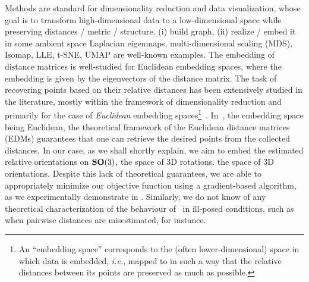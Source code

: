 Methods are standard for dimensionality reduction and data visualization, whose goal is to transform high-dimensional data to a low-dimensional space while preserving distances / metric / structure.
(i) build graph, (ii) realize / embed it in some ambient space
Laplacian eigenmaps, multi-dimensional scaling (MDS), Isomap, LLE, t-SNE, UMAP are well-known examples.
The embedding of distance matrices is well-studied for Euclidean embedding spaces, where the embedding is given by the eigenvectors of the distance matrix.
The task of recovering points based on their relative distances has been extensively studied in the literature, mostly within the framework of dimensionality reduction and primarily for the case of \textit{Euclidean} embedding spaces\footnote{An ``embedding space'' corresponds to the (often lower-dimensional) space in which data is embedded, \textit{i.e.}, mapped to in such a way that the relative distances between its points are preserved as much as possible.}~\cite{belkin2003laplacian,kruskal1978multidimensional, maaten2008visualizing, mcinnes2018umap,dokmanic2015euclidean}.
In~\cite{dokmanic2015euclidean}, the embedding space being Euclidean, the theoretical framework of the Euclidean distance matrices (EDMs) guarantees that one can retrieve the desired points from the collected distances.
In our case, as we shall shortly explain, we aim to embed the estimated relative orientations on $\mathrm{\mathbf{SO}}(3)$, the space of 3D rotations.
the space of 3D orientations.
Despite this lack of theoretical guarantees, we are able to appropriately minimize our objective function using a gradient-based algorithm, as we experimentally demonstrate in .
Similarly, we do not know of any theoretical characterization of the behaviour of~ in ill-posed conditions, such as when pairwise distances are misestimated, for instance.

